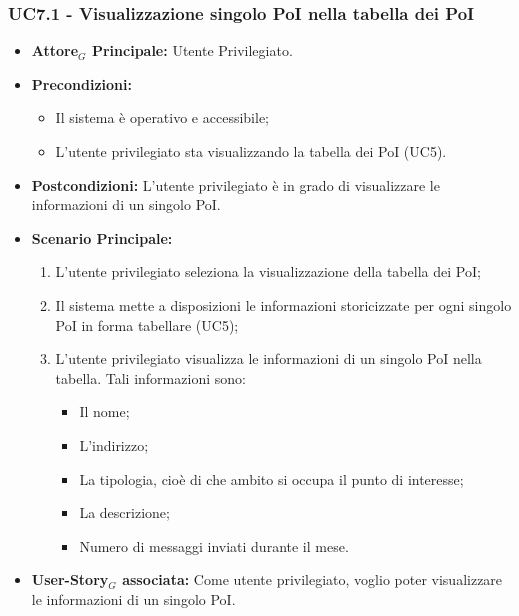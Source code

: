 \documentclass[11pt]{article}
\begin{document}
\begin{justify}
\subsubsection{\textbf{UC7.1 - Visualizzazione singolo PoI nella tabella dei PoI}}
\label{UC7.1}
\begin{itemize}
    \item \textbf{Attore$_G$ Principale:} Utente Privilegiato.
    \item \textbf{Precondizioni:} 
        \begin{itemize}
          \item Il sistema è operativo e accessibile;
            \item L'utente privilegiato sta visualizzando la tabella dei PoI (UC5).
        \end{itemize}
      \item \textbf{Postcondizioni:} L'utente privilegiato è in grado di visualizzare le informazioni di un singolo PoI.
    \item \textbf{Scenario Principale:} 
        \begin{enumerate}
        \item L'utente privilegiato seleziona la visualizzazione della tabella dei PoI;
          \item Il sistema mette a disposizioni le informazioni storicizzate per ogni singolo PoI in forma tabellare (UC5);
          \item L'utente privilegiato visualizza le informazioni di un singolo PoI nella tabella. Tali informazioni sono:
        \begin{itemize}
       \item Il nome;
       \item L'indirizzo;
       \item La tipologia, cioè di che ambito si occupa il punto di interesse;
       \item La descrizione;
         \item Numero di messaggi inviati durante il mese.
        \end{itemize}
        \end{enumerate}
    \item \textbf{User-Story$_G$ associata:} Come utente privilegiato, voglio poter visualizzare le informazioni di un singolo PoI.
\end{itemize}


\end{justify}
\end{document}
